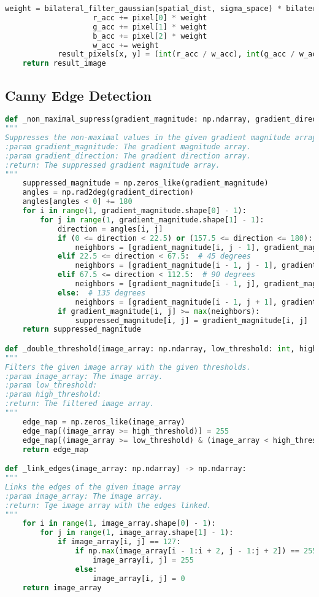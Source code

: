 {{\begin{lstlisting}[language=Python, caption={Codice del filtro bilaterale}, label={appendix:bilateral}]
					weight = bilateral_filter_gaussian(spatial_dist, sigma_space) * bilateral_filter_gaussian(range_dist, sigma_color)
					r_acc += pixel[0] * weight
					g_acc += pixel[1] * weight
					b_acc += pixel[2] * weight
					w_acc += weight
			result_pixels[x, y] = (int(r_acc / w_acc), int(g_acc / w_acc), int(b_acc / w_acc))
	return result_image
\end{lstlisting}}
\newpage
\subsection{Canny Edge Detection}
{\begin{lstlisting}[language=Python, caption={Codice del filtro di Canny}, label={appendix:canny}]
def _non_maximal_supress(gradient_magnitude: np.ndarray, gradient_direction: np.ndarray) -> np.ndarray:
"""
Suppresses the non-maximal values in the given gradient magnitude array.
:param gradient_magnitude: The gradient magnitude array.
:param gradient_direction: The gradient direction array.
:return: The suppressed gradient magnitude array.
"""
	suppressed_magnitude = np.zeros_like(gradient_magnitude)
	angles = np.rad2deg(gradient_direction)
	angles[angles < 0] += 180
	for i in range(1, gradient_magnitude.shape[0] - 1):
		for j in range(1, gradient_magnitude.shape[1] - 1):
			direction = angles[i, j]
			if (0 <= direction < 22.5) or (157.5 <= direction <= 180):  # 0 degrees
				neighbors = [gradient_magnitude[i, j - 1], gradient_magnitude[i, j + 1]]
			elif 22.5 <= direction < 67.5:  # 45 degrees
				neighbors = [gradient_magnitude[i - 1, j - 1], gradient_magnitude[i + 1, j + 1]]
			elif 67.5 <= direction < 112.5:  # 90 degrees
				neighbors = [gradient_magnitude[i - 1, j], gradient_magnitude[i + 1, j]]
			else:  # 135 degrees
				neighbors = [gradient_magnitude[i - 1, j + 1], gradient_magnitude[i + 1, j - 1]]
			if gradient_magnitude[i, j] >= max(neighbors):
				suppressed_magnitude[i, j] = gradient_magnitude[i, j]
	return suppressed_magnitude

def _double_threshold(image_array: np.ndarray, low_threshold: int, high_threshold: int) -> np.ndarray:
"""
Filters the given image array with the given thresholds.
:param image_array: The image array.
:param low_threshold:
:param high_threshold:
:return: The filtered image array.
"""
	edge_map = np.zeros_like(image_array)
	edge_map[(image_array >= high_threshold)] = 255
	edge_map[(image_array >= low_threshold) & (image_array < high_threshold)] = 127
	return edge_map

def _link_edges(image_array: np.ndarray) -> np.ndarray:
"""
Links the edges of the given image array
:param image_array: The image array.
:return: Tge image array with the edges linked.
"""
	for i in range(1, image_array.shape[0] - 1):
		for j in range(1, image_array.shape[1] - 1):
			if image_array[i, j] == 127:
				if np.max(image_array[i - 1:i + 2, j - 1:j + 2]) == 255:
					image_array[i, j] = 255
				else:
					image_array[i, j] = 0
	return image_array



\end{lstlisting}}}
